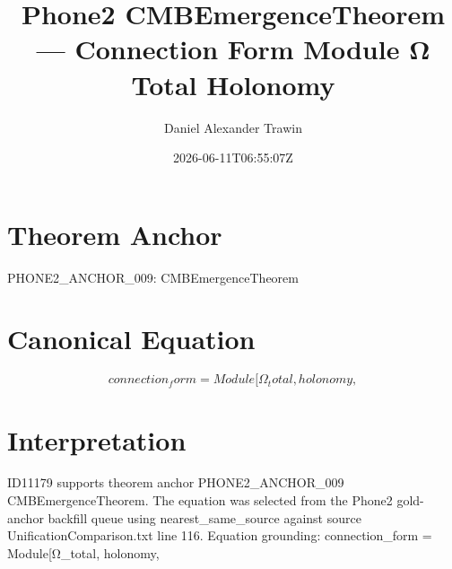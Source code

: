 \documentclass[11pt]{article}
\title{Phone2 CMBEmergenceTheorem — Connection Form Module Ω Total Holonomy}
\author{Daniel Alexander Trawin}
\date{2026-06-11T06:55:07Z}
\begin{document}
\maketitle
\section*{Theorem Anchor}
PHONE2_ANCHOR_009: CMBEmergenceTheorem
\section*{Canonical Equation}
\[
connection_form = Module[{Ω_total, holonomy},
\]
\section*{Interpretation}
ID11179 supports theorem anchor PHONE2_ANCHOR_009 CMBEmergenceTheorem. The equation was selected from the Phone2 gold-anchor backfill queue using nearest_same_source against source UnificationComparison.txt line 116. Equation grounding: connection_form = Module[{Ω_total, holonomy},
\end{document}
